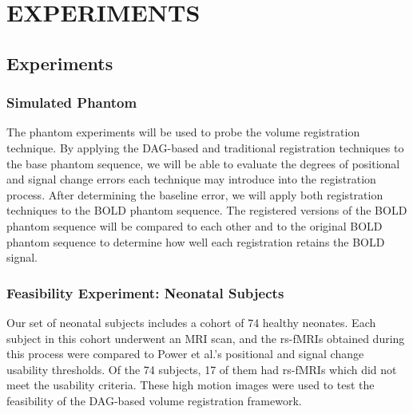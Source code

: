 \chapter{EXPERIMENTS}

\section{Experiments}

\subsection{Simulated Phantom}

The phantom experiments will be used to probe the volume registration technique. By applying the DAG-based and traditional registration techniques to the base phantom sequence, we will be able to evaluate the degrees of positional and signal change errors each technique may introduce into the registration process. After determining the baseline error, we will apply both registration techniques to the BOLD phantom sequence. The registered versions of the BOLD phantom sequence will be compared to each other and to the original BOLD phantom sequence to determine how well each registration retains the BOLD signal.


\subsection{Feasibility Experiment: Neonatal Subjects}


Our set of neonatal subjects includes a cohort of 74 healthy neonates. Each subject in this cohort underwent an MRI scan, and the rs-fMRIs obtained during this process were compared to Power et al.'s positional and signal change usability thresholds. Of the 74 subjects, 17 of them had rs-fMRIs which did not meet the usability criteria. These high motion images were used to test the feasibility of the DAG-based volume registration framework. 

